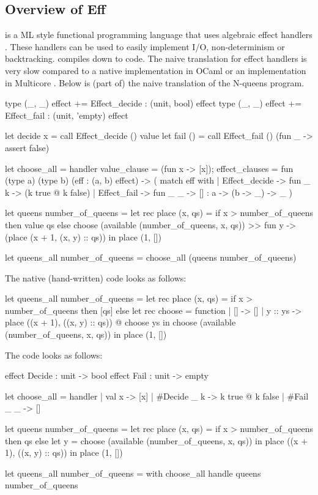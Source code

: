 \subsection{Overview of Eff}
\eff is a ML style functional programming language that uses algebraic effect handlers \cite{eff}. These handlers can be used to easily implement I/O, non-determinism or backtracking. \eff compiles down to \ocaml code. The naive translation for effect handlers is very slow compared to a native implementation in OCaml or an implementation in Multicore \ocaml \cite{KCeff}. Below is (part of) the naive translation of the N-queens program. \label{queenscomp}
\begin{ocamllisting}
type (_, _) effect += Effect_decide : (unit, bool) effect
type (_, _) effect += Effect_fail : (unit, 'empty) effect

let decide x = call Effect_decide () value
let fail () = call Effect_fail () (fun _ -> assert false)

let choose_all = handler {
  value_clause = (fun x -> [x]);
  effect_clauses = fun (type a) (type b) (eff : (a, b) effect) -> (
    match eff with
    | Effect_decide -> fun _ k ->
        (k true @ k false)
    | Effect_fail -> fun _ _ ->
        []
    :
    a -> (b -> _) -> _
  )
}

let queens number_of_queens =
  let rec place (x, qs) =
    if x > number_of_queens then value qs else
      choose (available (number_of_queens, x, qs)) >>
      fun y -> (place (x + 1, (x, y) :: qs))
  in
  place (1, [])
  
let queens_all number_of_queens =
  choose_all (queens number_of_queens)
\end{ocamllisting}
The native (hand-written) code looks as follows: \label{queensnative}
\begin{ocamllisting}
let queens_all number_of_queens =
  let rec place (x, qs) =
    if x > number_of_queens then [qs] else
      let rec choose = function
        | [] -> []
        | y :: ys ->
            place ((x + 1), ((x, y) :: qs)) @ choose ys
      in
      choose (available (number_of_queens, x, qs))
  in
  place (1, [])
\end{ocamllisting}
The \eff code looks as follows: \label{queenseff}
\begin{efflisting}
effect Decide : unit -> bool
effect Fail : unit -> empty

let choose_all = handler
  | val x -> [x]
  | #Decide _ k -> k true @ k false
  | #Fail _ _ -> []
  
let queens number_of_queens =
  let rec place (x, qs) =
    if x > number_of_queens then qs else
      let y = choose (available (number_of_queens, x, qs)) in
      place ((x + 1), ((x, y) :: qs))
  in
  place (1, [])

let queens_all number_of_queens =
  with choose_all handle queens number_of_queens
\end{efflisting}
